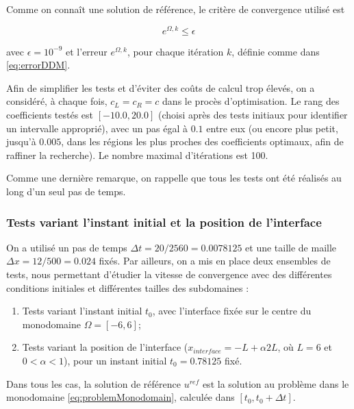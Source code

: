 \indent Comme on connaît une solution de référence, le critère de convergence utilisé est

\begin{equation*}
\label{eq:criteriaConvergence}
	e^{\Omega,k} \leq \epsilon
\end{equation*}

\noindent avec $\epsilon = 10^{-9}$ et  l'erreur $e^{\Omega,k}$, pour chaque itération $k$, définie comme dans \eqref{eq:errorDDM}.

\indent Afin de simplifier les tests et d'éviter des coûts de calcul trop élevés,  on a considéré, à chaque fois, $c_L = c_R = c$  dans le procès d'optimisation. Le rang des coefficients testés est $[-10.0, 20.0]$ (choisi après des tests initiaux pour identifier un intervalle approprié), avec un pas égal à  $0.1$ entre eux (ou encore plus petit, jusqu'à $0.005$, dans les régions les plus proches des coefficients optimaux, afin de raffiner la recherche). Le nombre maximal d'itérations est 100.

\indent Comme une dernière remarque, on rappelle que tous les tests ont été réalisés au long d'un seul pas de temps.

\subsubsection{Tests variant l'instant initial et la position de l'interface}

\indent On a utilisé un pas de temps $\Delta t = 20/2560 = 0.0078125$ et une taille de maille $\Delta x = 12/500 = 0.024$ fixés. Par ailleurs, on a mis en place deux ensembles de tests, nous permettant d'étudier la vitesse de convergence avec des différentes conditions initiales et différentes tailles des subdomaines :

\begin{enumerate}
	\item Tests variant l'instant initial $t_0$, avec l'interface fixée sur le centre du monodomaine $\Omega = [-6,6]$;
	\item Tests variant la position de l'interface ($x_{interface} = -L + \alpha 2L$, où  $L = 6$ et $0 < \alpha < 1$), pour un instant initial $t_0 = 0.78125$ fixé.
\end{enumerate}

\indent Dans tous les cas, la solution de référence $u^{ref}$ est la solution au problème dans le monodomaine \eqref{eq:problemMonodomain}, calculée dans $[t_0,t_0 + \Delta t]$.

